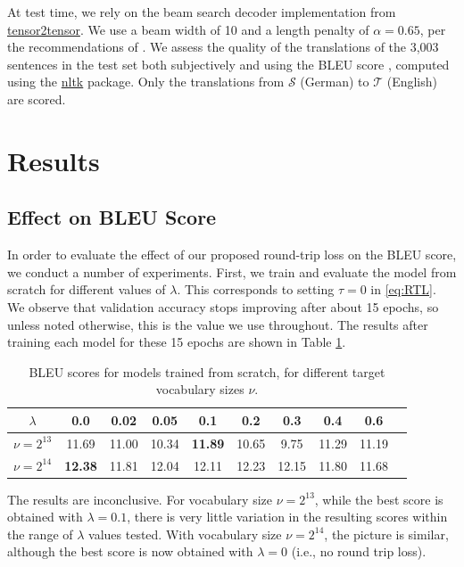 \documentclass[10pt,a4paper]{article}
\begin{document}
At test time, we rely on the beam search decoder implementation from \href{https://github.com/tensorflow/tensor2tensor/blob/master/tensor2tensor/utils}{tensor2tensor}. We use a beam width of 10 and a length penalty of $\alpha=0.65$, per the recommendations of \citet{googlenmt}. We assess the quality of the translations of the 3,003 sentences in the test set both subjectively and using the BLEU score \citep{bleu}, computed using the \href{https://www.nltk.org/}{nltk} package. Only the translations from $\mathcal{S}$ (German) to $\mathcal{T}$ (English) are scored.




\section{Results}\label{sec:results}
\subsection{Effect on BLEU Score}
In order to evaluate the effect of our proposed round-trip loss on the BLEU score, we conduct a number of experiments. First, we train and evaluate the model from scratch for different values of $\lambda$.  This corresponds to setting $\tau=0$ in \eqref{eq:RTL}. We observe that validation accuracy stops improving after about 15 epochs, so unless noted otherwise, this is the value we use throughout. The results after training each model for these 15 epochs are shown in Table \ref{tab:result1}.

\begin{table} [ht]
\centering
\small
\begin{tabular}{lccccccccc}
	\toprule
  \multicolumn{1}{c}{$\lambda$} & 0.0 & 0.02 & 0.05 & 0.1 & 0.2 & 0.3 & 0.4 &  0.6 \\ \midrule
  $\nu=2^{13}$ & 11.69 & 11.00 & 10.34 & \textbf{11.89} & 10.65 & 9.75 & 11.29 &  11.19 \\
  $\nu=2^{14}$ & \textbf{12.38} & 11.81 & 12.04 & 12.11 & 12.23 & 12.15 & 11.80 &  11.68 \\
  \bottomrule
\end{tabular}
\caption{BLEU scores for models trained from scratch, for different target vocabulary sizes $\nu$.}
\label{tab:result1}
\end{table}

The results are inconclusive. For vocabulary size $\nu=2^{13}$, while the best score is obtained with $\lambda=0.1$, there is very little variation in the resulting scores within the range of $\lambda$ values tested. With vocabulary size $\nu=2^{14}$, the picture is similar, although the best score is now obtained with $\lambda=0$ (i.e., no round trip loss).
\end{document}
